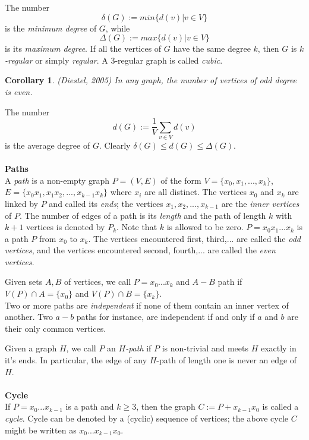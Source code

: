 \documentclass[12pt]{report}
\newtheorem{cor}[thm]{Corollary}
\begin{document}
The number $$\delta(G):=min\{d(v) |v\in V\}$$ is the {\em minimum
degree} of $G$, while $$\Delta(G):=max\{d(v)|v\in V\}$$ is its {\em
maximum degree}. If all the vertices of $G$ have the same degree
$k$, then $G$ is {\em $k$-regular} or simply {\em regular}. A
$3$-regular graph is called {\em cubic}.
\begin{cor}(Diestel, 2005)
In any graph, the number of vertices of odd degree is even.
\end{cor}
The number $$d(G):=\frac{1}{V}\sum_{v\in V} d(v)$$ is the average degree of $G$. Clearly $\delta (G)\leq d(G) \leq \Delta (G)$.\\
\\
{\bf    Paths}\\
A {\em path} is a non-empty graph $P=(V,E)$ of the form
$V=\{x_0,x_1,...,x_k\}$, $E=\{x_0x_1,x_1x_2,...,x_{k-1}x_k\}$ where
$x_i$ are all distinct. The vertices $x_0$ and $x_k$ are linked by
$P$ and called its {\em ends}; the vertices $x_1,x_2,...,x_{k-1}$
are the {\em inner vertices} of $P$. The number of edges of a path
is its {\em length} and the path of length $k$ with $k+1$ vertices
is denoted by $P_k$. Note that $k$ is allowed to be zero.
$P=x_0x_1...x_k $ is a path $P$ from $x_0$ to $x_k$. The vertices
encountered first, third,... are called the {\em odd vertices}, and
the vertices encountered second, fourth,... are called the {\em even
vertices}.

 Given sets $A, B$ of vertices, we call $P=x_0...x_k$ and $A-B$ path if $V(P)\cap A=\{x_0\}$ and $V(P)\cap B=\{x_k\}$.\\
Two or more paths are {\em independent} if none of them contain an
inner vertex of another. Two $a-b$ paths for instance, are
independent if and only if $a$ and $b$ are their only common
vertices.

Given a graph $H$, we call $P$ an {\em $H$-path} if $P$ is non-trivial and meets $H$ exactly in it's ends. In particular, the edge of any $H$-path of length one is never an edge of $H$.\\
\\
{\bf Cycle}\\  If $P=x_0...x_{k-1}$ is a path and $k\geq 3$, then
the graph $C:=P+x_{k-1}x_0$ is called a {\em cycle}. Cycle can be
denoted by a (cyclic) sequence of vertices; the above cycle $C$
might be written as $x_0...x_{k-1}x_0$.
\end{document}
